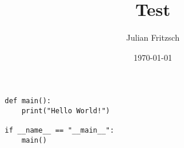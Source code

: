 \documentclass{article}
\begin{document}
\author{Julian Fritzsch}
\title{Test}
\date{\today}
\maketitle

\begin{verbatim}
def main():
    print("Hello World!")

if __name__ == "__main__":
    main()
\end{verbatim}
\end{document}
